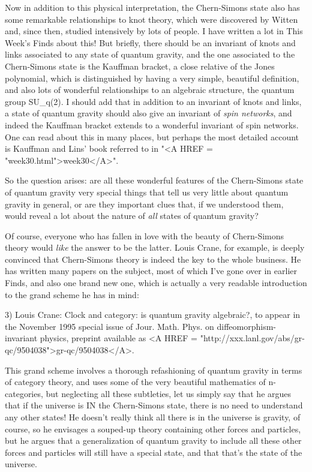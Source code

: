 Now in addition to this physical interpretation, the Chern-Simons
state also has some remarkable relationships to knot theory, which
were discovered by Witten and, since then, studied intensively
by lots of people.  I have written a lot in This Week's Finds about
this!  But briefly, there should be an invariant of knots and links associated
to any state of quantum gravity, and the one associated to the Chern-Simons
state is the Kauffman bracket, a close relative of the Jones polynomial,
which is distinguished by having a very simple, beautiful definition,
and also lots of wonderful relationships to an algebraic structure, 
the quantum group SU_q(2).  I should add that in addition to an invariant
of knots and links, a state of quantum gravity should also give an 
invariant of \emph{spin networks}, and indeed the Kauffman bracket extends
to a wonderful invariant of spin networks.  One can read about this
in many places, but perhaps the most detailed account is Kauffman and
Lins' book referred to in "<A HREF = "week30.html">week30</A>".
  
So the question arises: are all these wonderful features of the 
Chern-Simons state of quantum gravity very special things that 
tell us very little about quantum gravity in general, or are they
important clues that, if we understood them, would reveal a lot
about the nature of \emph{all} states of quantum gravity?

Of course, everyone who has fallen in love with the beauty of
Chern-Simons theory would \emph{like} the answer to be the latter.
Louis Crane, for example, is deeply convinced that Chern-Simons
theory is indeed the key to the whole business.  He has written many
papers on the subject, most of which I've gone over in earlier Finds,
and also one brand new one, which is actually a very readable
introduction to the grand scheme he has in mind:

3) Louis Crane: Clock and category: is quantum gravity algebraic?,
to appear in the November 1995 special issue of Jour. Math. Phys. on
diffeomorphism-invariant physics, preprint available as <A HREF = "http://xxx.lanl.gov/abs/gr-qc/9504038">gr-qc/9504038</A>.

This grand scheme involves a thorough refashioning of quantum gravity 
in terms of category theory, and uses some of the very beautiful mathematics
of n-categories, but neglecting all these subtleties, let us simply say that
he argues that if the universe is IN the Chern-Simons state, there is no
need to understand any other states!  He doesn't really think all there
is in the universe is gravity, of course, so he envisages a souped-up
theory containing other forces and particles, but he argues that a 
generalization of quantum gravity to include all these other forces and
particles will still have a special state, and that that's the state of the 
universe.  

